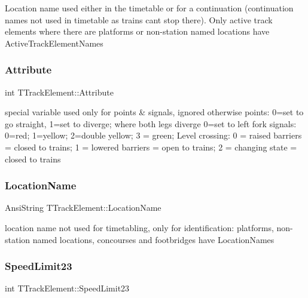 Location name used either in the timetable or for a continuation (continuation names not used in timetable as trains can\textquotesingle{}t stop there). Only active track elements where there are platforms or non-\/station named locations have Active\+Track\+Element\+Names \mbox{\label{class_t_track_element_a16594caf5c9e6a35bd4120ad639b8cc2}} 
\subsubsection{\texorpdfstring{Attribute}{Attribute}}
{\footnotesize\ttfamily int T\+Track\+Element\+::\+Attribute}

special variable used only for points \& signals, ignored otherwise points\+: 0=set to go straight, 1=set to diverge; where both legs diverge 0=set to left fork signals\+: 0=red; 1=yellow; 2=double yellow; 3 = green; Level crossing\+: 0 = raised barriers = closed to trains; 1 = lowered barriers = open to trains; 2 = changing state = closed to trains \mbox{\label{class_t_track_element_ae4aec8db868ce67f4ec275ce5a2249dc}} 
\subsubsection{\texorpdfstring{Location\+Name}{LocationName}}
{\footnotesize\ttfamily Ansi\+String T\+Track\+Element\+::\+Location\+Name}

location name not used for timetabling, only for identification\+: platforms, non-\/station named locations, concourses and footbridges have Location\+Names \mbox{\label{class_t_track_element_abd898b7031200a2f24c1315b52c965cd}} 
\subsubsection{\texorpdfstring{Speed\+Limit23}{SpeedLimit23}}
{\footnotesize\ttfamily int T\+Track\+Element\+::\+Speed\+Limit23}

